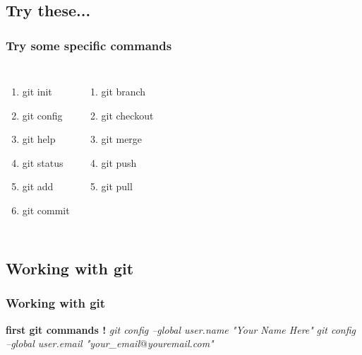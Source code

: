 \documentclass{beamer}
\begin{document}
\subsection{Try these...}
\begin{frame}
\frametitle{Try some specific commands}
\begin{columns}[c] %
\begin{enumerate}
\item git init
\item git config
\item git help
\item git status
\item git add
\item git commit
\end{enumerate}

\begin{enumerate}
\item git branch
\item git checkout
\item git merge
\item git push
\item git pull
\end{enumerate}
\end{columns}
\end{frame}

\subsection{Working with git}
\begin{frame}
\frametitle{Working with git}
\textbf{first git commands !}
\vspace{1cm}
\newline
\textit {git config --global user.name "Your Name Here"}
\newline
\textit {git config --global user.email "your\_email$@$youremail.com"}
\newline
\end{frame}
\end{document}
